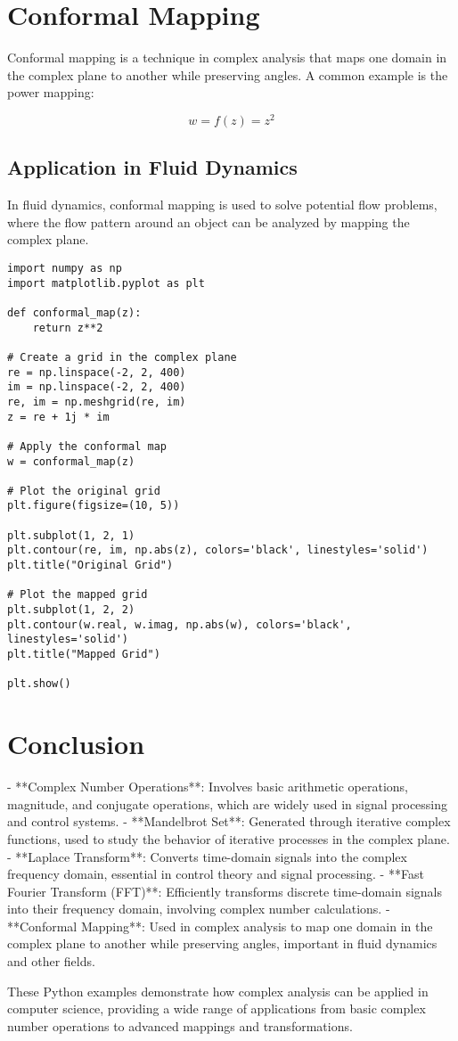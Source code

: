 \documentclass{article}
\begin{document}
\section{Conformal Mapping}
Conformal mapping is a technique in complex analysis that maps one domain in the complex plane to another while preserving angles. A common example is the power mapping:

\[
w = f(z) = z^2
\]

\subsection{Application in Fluid Dynamics}
In fluid dynamics, conformal mapping is used to solve potential flow problems, where the flow pattern around an object can be analyzed by mapping the complex plane.

\begin{lstlisting}[caption={conformal_mapping.py -- Conformal Mapping Implementation}, label=code:conformal_mapping]
import numpy as np
import matplotlib.pyplot as plt

def conformal_map(z):
    return z**2

# Create a grid in the complex plane
re = np.linspace(-2, 2, 400)
im = np.linspace(-2, 2, 400)
re, im = np.meshgrid(re, im)
z = re + 1j * im

# Apply the conformal map
w = conformal_map(z)

# Plot the original grid
plt.figure(figsize=(10, 5))

plt.subplot(1, 2, 1)
plt.contour(re, im, np.abs(z), colors='black', linestyles='solid')
plt.title("Original Grid")

# Plot the mapped grid
plt.subplot(1, 2, 2)
plt.contour(w.real, w.imag, np.abs(w), colors='black', linestyles='solid')
plt.title("Mapped Grid")

plt.show()
\end{lstlisting}

\section{Conclusion}
- **Complex Number Operations**: Involves basic arithmetic operations, magnitude, and conjugate operations, which are widely used in signal processing and control systems.
- **Mandelbrot Set**: Generated through iterative complex functions, used to study the behavior of iterative processes in the complex plane.
- **Laplace Transform**: Converts time-domain signals into the complex frequency domain, essential in control theory and signal processing.
- **Fast Fourier Transform (FFT)**: Efficiently transforms discrete time-domain signals into their frequency domain, involving complex number calculations.
- **Conformal Mapping**: Used in complex analysis to map one domain in the complex plane to another while preserving angles, important in fluid dynamics and other fields.

These Python examples demonstrate how complex analysis can be applied in computer science, providing a wide range of applications from basic complex number operations to advanced mappings and transformations.
\end{document}
